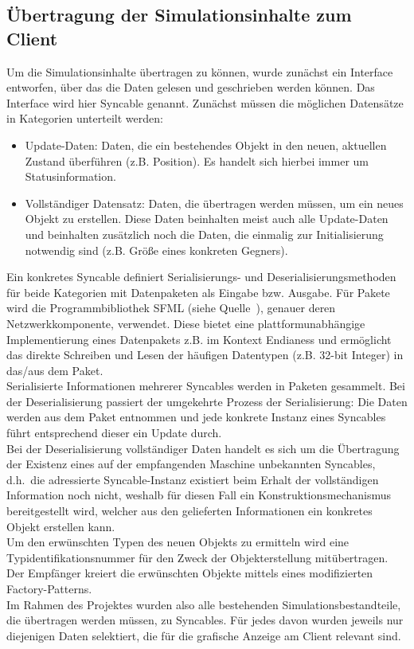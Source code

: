 \subsection{Übertragung der Simulationsinhalte zum Client}
\label{sec:syncable}
Um die Simulationsinhalte übertragen zu können, wurde zunächst ein Interface entworfen, über das die Daten gelesen und geschrieben werden können. Das Interface wird hier Syncable genannt.
Zunächst müssen die möglichen Datensätze in Kategorien unterteilt werden:
\begin{itemize}
\item Update-Daten: Daten, die ein bestehendes Objekt in den neuen, aktuellen Zustand überführen (z.B. Position). Es handelt sich hierbei immer um Statusinformation.
\item Vollständiger Datensatz: Daten, die übertragen werden müssen, um ein neues Objekt zu erstellen. Diese Daten beinhalten meist auch alle Update-Daten und beinhalten zusätzlich noch die Daten, die einmalig zur Initialisierung notwendig sind (z.B. Größe eines konkreten Gegners).
\end{itemize}
Ein konkretes Syncable definiert Serialisierungs- und Deserialisierungsmethoden für beide Kategorien mit Datenpaketen als Eingabe bzw. Ausgabe. Für Pakete wird die Programmbibliothek SFML (siehe Quelle~\cite{sfml}), genauer deren Netzwerkkomponente, verwendet. Diese bietet eine plattformunabhängige Implementierung eines Datenpakets z.B. im Kontext Endianess und ermöglicht das direkte Schreiben und Lesen der häufigen Datentypen (z.B. 32-bit Integer) in das/aus dem Paket.\\
Serialisierte Informationen mehrerer Syncables werden in Paketen gesammelt.
Bei der Deserialisierung passiert der umgekehrte Prozess der Serialisierung: Die Daten werden aus dem Paket entnommen und jede konkrete Instanz eines Syncables führt entsprechend dieser ein Update durch.\\
Bei der Deserialisierung vollständiger Daten handelt es sich um die Übertragung der Existenz eines auf der empfangenden Maschine unbekannten Syncables, d.h.~die adressierte Syncable-Instanz existiert beim Erhalt der vollständigen Information noch nicht, weshalb für diesen Fall ein Konstruktionsmechanismus bereitgestellt wird, welcher aus den gelieferten Informationen ein konkretes Objekt erstellen kann.\\
Um den erwünschten Typen des neuen Objekts zu ermitteln wird eine Typidentifikationsnummer für den Zweck der Objekterstellung mitübertragen.
Der Empfänger kreiert die erwünschten Objekte mittels eines modifizierten Factory-Patterns.\\
Im Rahmen des Projektes wurden also alle bestehenden Simulationsbestandteile, die übertragen werden müssen, zu Syncables. Für jedes davon wurden jeweils nur diejenigen Daten selektiert, die für die grafische Anzeige am Client relevant sind.\\


